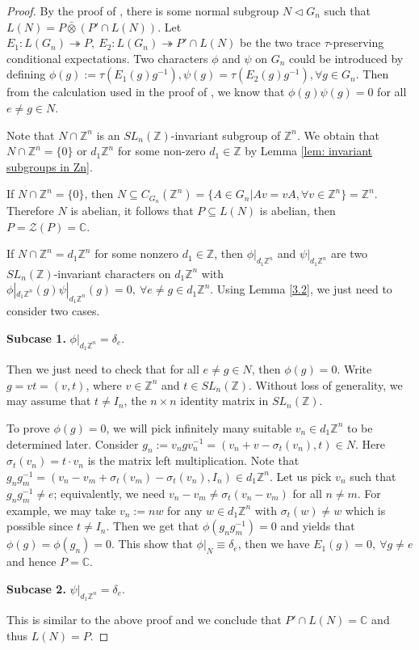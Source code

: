 \documentclass[12pt]{amsart}
\theoremstyle{definition}
\theoremstyle{remark}
\begin{document}
\begin{proof}
By the proof of \cite[Theorem 3.1]{cds}, there is some normal subgroup $N\lhd G_n$ such that $L(N)=P\bar\otimes (P'\cap L(N))$. Let $E_{1}:L(G_n)\twoheadrightarrow P,~ E_{2}:L(G_n)\twoheadrightarrow P'\cap L(N)$ be the two trace $\tau$-preserving conditional expectations. Two characters $\phi$ and $\psi$ on $G_n$ could be introduced by defining $\phi(g):=\tau(E_{1}(g)g^{-1}),\psi(g)=\tau(E_{2}(g)g^{-1}), \forall g\in G_n$. Then  from the calculation used in the proof of \cite[Proposition 3.2]{jz}, we know that $\phi(g)\psi(g)=0$ for all $e\ne g\in N$.




Note that $N\cap \mathbb{\mathbb{Z}}^n$ is an $SL_{n}(\mathbb{Z})$-invariant subgroup of $\mathbb{Z}^n$. We obtain that $N\cap \mathbb{\mathbb{Z}}^n = \{0\}$ or $d_1\mathbb{Z}^n$ for some non-zero $d_1\in \mathbb{Z}$ by Lemma \ref{lem: invariant subgroups in Zn}.

If $N\cap \mathbb{\mathbb{Z}}^n = \{0\}$, then  $N\subseteq C_{G_n}(\mathbb{Z}^n)=\{A\in G_n|Av=vA,\forall v\in \mathbb{Z}^n\}=\mathbb{Z}^n$. Therefore $N$ is abelian, it follows that $P\subseteq L(N)$ is abelian, then $P = \mathcal{Z}(P) = \mathbb{C}$.

If $N\cap \mathbb{\mathbb{Z}}^n = d_1\mathbb{Z}^n$ for some nonzero $d_1\in \mathbb{Z}$, then $\phi|_{d_{1}\mathbb{Z}^n}$ and $\psi|_{d_{1}\mathbb{Z}^n}$ are two $SL_{n}(\mathbb{Z})$-invariant characters on $d_1\mathbb{Z}^n$ with $\phi|_{d_{1}\mathbb{Z}^n}(g)\psi|_{d_{1}\mathbb{Z}^n}(g) = 0,~\forall e\ne g \in d_1\mathbb{Z}^n$. Using Lemma \ref{3.2}, we just need to consider two cases.

\textbf{Subcase 1.} $\phi|_{d_{1}\mathbb{Z}^n}=\delta_e$.

Then we just need to check that for all $e\neq g \in N$, then $\phi(g)=0$. Write  $g =vt= (v,t)$, where $v\in \mathbb{Z}^n$ and $t\in SL_n(\mathbb{Z})$. Without loss of generality, we may assume that $t\ne I_n$, the $n\times n$ identity matrix in $SL_n(\mathbb{Z})$.

To prove $\phi(g)=0$, we will pick infinitely many suitable $v_n\in d_1\mathbb{Z}^n$ to be determined later. Consider $g_{n}:=v_{n}gv_{n}^{-1}=(v_{n}+v-\sigma _{t}(v_{n}),t)\in N$. Here $\sigma_t(v_n)=t\cdot v_n$ is the matrix left multiplication.  Note that $g_{n}g_{m}^{-1}=(v_{n}-v_{m}+\sigma_t(v_{m})-\sigma_t(v_{n}),I_{n})\in d_1\mathbb{Z}^n$. Let us pick $v_n$ such that $g_ng_m^{-1} \ne e$; equivalently, we need $v_n - v_m \ne \sigma_t(v_n - v_m)$ for all $n\ne m$. For example, we may take $v_n:=nw$ for any $w\in d_1\mathbb{Z}^n$ with $\sigma_{t}(w)\ne w$ which is possible since $t\neq I_n$.
Then we get that $\phi(g_ng_m^{-1})=0$ and \cite[Lemma2.7]{dj} yields that $\phi(g) = \phi(g_n) = 0$. This show that $\phi|_{N} \equiv \delta_e$, then we have $E_1(g) = 0,~\forall g\neq e$ and hence $P=\mathbb{C}$.

\textbf{Subcase 2.} $\psi|_{d_{1}\mathbb{Z}^n} = \delta_e$.

This is similar to the above proof and we conclude that $P'\cap L(N) = \mathbb{C}$ and thus $L(N)=P$.
\end{proof}
\end{document}
